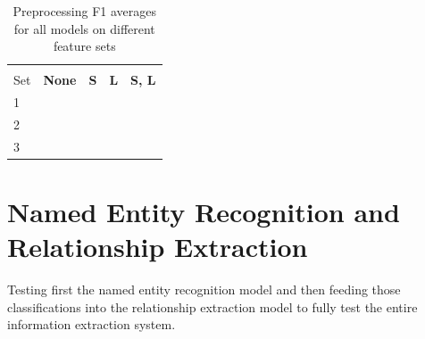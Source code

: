 \documentclass[11pt,oneside]{book}
\begin{document}
\begin{longtable}[c]{|l|l|l|l|l|}
\caption{Preprocessing F1 averages for all models on different feature sets}
\label{tab:re_preprocessing}\\
\hline
\textbf{\begin{tabular}[c]{@{}l@{}}Feature \\ Set\end{tabular}} & \multicolumn{1}{c|}{\textbf{None}} & \multicolumn{1}{c|}{\textbf{S}} & \multicolumn{1}{c|}{\textbf{L}} & \multicolumn{1}{c|}{\textbf{S, L}} \\ \hline
\endfirsthead
%
\endhead
%
1                                                               & \multicolumn{1}{c|}{}              & \multicolumn{1}{c|}{}           &                                 &                                    \\ \hline
2                                                               &                                    &                                 &                                 &                                    \\ \hline
3                                                               &                                    &                                 &                                 &                                    \\ \hline
\end{longtable}


\section{Named Entity Recognition and Relationship Extraction}

Testing first the named entity recognition model and then feeding those classifications into the relationship extraction model to fully test the entire information extraction system.
\end{document}
